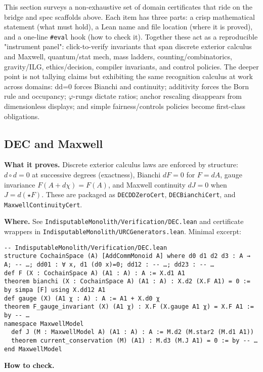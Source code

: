 \documentclass[11pt,a4paper,twoside]{article}
\numberwithin{equation}{section}
\newcommand{\phigr}{\varphi} %
\theoremstyle{customthm}
\theoremstyle{customdef}
\theoremstyle{customrem}
\begin{document}
This section surveys a non-exhaustive set of domain certificates that ride on the bridge and spec scaffolds above. Each item has three parts: a crisp mathematical statement (what must hold), a Lean name and file location (where it is proved), and a one-line \texttt{\#eval} hook (how to check it). Together these act as a reproducible "instrument panel": click-to-verify invariants that span discrete exterior calculus and Maxwell, quantum/stat mech, mass ladders, counting/combinatorics, gravity/ILG, ethics/decision, compiler invariants, and control policies. The deeper point is not tallying claims but exhibiting the same recognition calculus at work across domains: dd=0 forces Bianchi and continuity; additivity forces the Born rule and occupancy; $\phigr$-rungs dictate ratios; anchor rescaling disappears from dimensionless displays; and simple fairness/controls policies become first-class obligations.

\subsection{DEC and Maxwell}

\textbf{What it proves.} Discrete exterior calculus laws are enforced by structure: \(d\circ d=0\) at successive degrees (exactness), Bianchi \(dF=0\) for \(F=dA\), gauge invariance \(F(A+d\chi)=F(A)\), and Maxwell continuity \(dJ=0\) when \(J=d(\star F)\). These are packaged as \texttt{DECDDZeroCert}, \texttt{DECBianchiCert}, and \texttt{MaxwellContinuityCert}.

\textbf{Where.} See \texttt{IndisputableMonolith/Verification/DEC.lean} and certificate wrappers in \texttt{IndisputableMonolith/URCGenerators.lean}. Minimal excerpt:

\begin{lstlisting}
-- IndisputableMonolith/Verification/DEC.lean
structure CochainSpace (A) [AddCommMonoid A] where d0 d1 d2 d3 : A → A; -- …; dd01 : ∀ x, d1 (d0 x)=0; dd12 : -- …; dd23 : -- …
def F (X : CochainSpace A) (A1 : A) : A := X.d1 A1
theorem bianchi (X : CochainSpace A) (A1 : A) : X.d2 (X.F A1) = 0 := by simpa [F] using X.dd12 A1
def gauge (X) (A1 χ : A) : A := A1 + X.d0 χ
theorem F_gauge_invariant (X) (A1 χ) : X.F (X.gauge A1 χ) = X.F A1 := by -- …
namespace MaxwellModel
  def J (M : MaxwellModel A) (A1 : A) : A := M.d2 (M.star2 (M.d1 A1))
  theorem current_conservation (M) (A1) : M.d3 (M.J A1) = 0 := by -- …
end MaxwellModel
\end{lstlisting}

\textbf{How to check.}
\end{document}
